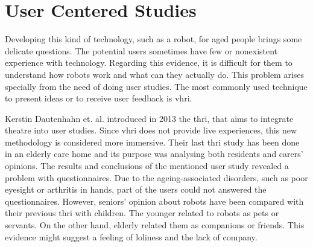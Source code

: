 \section{User Centered Studies} \label{sec:userstudies}

Developing this kind of technology, such as a robot, for aged people brings some delicate questions.
The potential users sometimes have few or nonexistent experience with technology.
Regarding this evidence, it is difficult for them to understand how robots work and what can they actually do.
This problem arises specially from the need of doing user studies.
The most commonly used technique to present ideas or to receive user feedback is \gls{vhri}.

Kerstin Dautenhahn  et. al. introduced in 2013 the \gls{thri}, that aims to integrate theatre into user studies.
Since \gls{vhri} does not provide live experiences, this new methodology is considered more immersive.
Their last \gls{thri} study has been done in an elderly care home and its purpose was analysing both residents and carers' opinions.
The results and conclusions of the mentioned user study revealed a problem with questionnaires.
Due to the ageing-associated disorders, such as poor eyesight or arthritis in hands, part of the users could not answered the questionnaires.
However, seniors' opinion about robots have been compared with their previous \gls{thri} with children.
The younger related to robots as pets or servants.
On the other hand, elderly related them as companions or friends.
This evidence might suggest a feeling of loliness and the lack of company.

